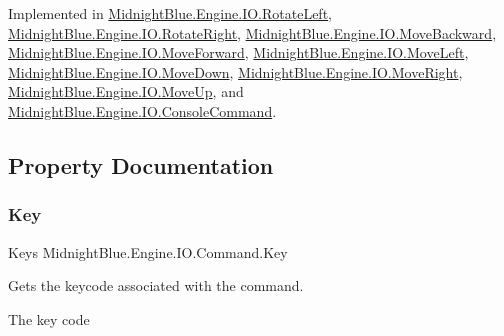 Implemented in \hyperlink{class_midnight_blue_1_1_engine_1_1_i_o_1_1_rotate_left_a4c56e0447bb253e4c53c206788e228da}{Midnight\+Blue.\+Engine.\+I\+O.\+Rotate\+Left}, \hyperlink{class_midnight_blue_1_1_engine_1_1_i_o_1_1_rotate_right_a6f3a6e2c0bed610a90f0333b38872cb4}{Midnight\+Blue.\+Engine.\+I\+O.\+Rotate\+Right}, \hyperlink{class_midnight_blue_1_1_engine_1_1_i_o_1_1_move_backward_ab6756c1bb48258e4d50038f492d70bae}{Midnight\+Blue.\+Engine.\+I\+O.\+Move\+Backward}, \hyperlink{class_midnight_blue_1_1_engine_1_1_i_o_1_1_move_forward_af8ec50143e331661a140b7aea0245616}{Midnight\+Blue.\+Engine.\+I\+O.\+Move\+Forward}, \hyperlink{class_midnight_blue_1_1_engine_1_1_i_o_1_1_move_left_aa5f056a72d45e8c335480c294c53b170}{Midnight\+Blue.\+Engine.\+I\+O.\+Move\+Left}, \hyperlink{class_midnight_blue_1_1_engine_1_1_i_o_1_1_move_down_aeeed692e99119e5818051a87956c80d1}{Midnight\+Blue.\+Engine.\+I\+O.\+Move\+Down}, \hyperlink{class_midnight_blue_1_1_engine_1_1_i_o_1_1_move_right_ac5599c043c22620c4dc35c89fcc85728}{Midnight\+Blue.\+Engine.\+I\+O.\+Move\+Right}, \hyperlink{class_midnight_blue_1_1_engine_1_1_i_o_1_1_move_up_afd6d8930768f079467bf7872694151b3}{Midnight\+Blue.\+Engine.\+I\+O.\+Move\+Up}, and \hyperlink{class_midnight_blue_1_1_engine_1_1_i_o_1_1_console_command_a603fc84ab28db867d9cc5143b95ebcb6}{Midnight\+Blue.\+Engine.\+I\+O.\+Console\+Command}.



\subsection{Property Documentation}
\hypertarget{class_midnight_blue_1_1_engine_1_1_i_o_1_1_command_a01ee6a88fbfdc3c5aa0984720f6c4cce}{}\label{class_midnight_blue_1_1_engine_1_1_i_o_1_1_command_a01ee6a88fbfdc3c5aa0984720f6c4cce} 
\subsubsection{\texorpdfstring{Key}{Key}}
{\footnotesize\ttfamily Keys Midnight\+Blue.\+Engine.\+I\+O.\+Command.\+Key\hspace{0.3cm}{\ttfamily [get]}}



Gets the keycode associated with the command. 

The key code\hypertarget{class_midnight_blue_1_1_engine_1_1_i_o_1_1_command_ac423cb29bcb47794c22ad6f5b0847ee6}{}\label{class_midnight_blue_1_1_engine_1_1_i_o_1_1_command_ac423cb29bcb47794c22ad6f5b0847ee6} 
